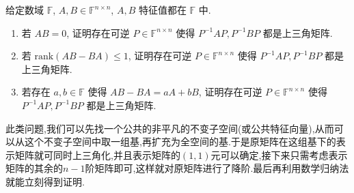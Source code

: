\documentclass[../../main.tex]{subfiles}%
\begin{document}
\begin{proposition}\label{proposition:两个矩阵可同时上三角化的条件}
给定数域 \( \mathbb{F} \), \( A, B \in \mathbb{F}^{n \times n} \), \( A, B \) 特征值都在 \( \mathbb{F} \) 中.
\begin{enumerate}
\item 若 \( AB = 0 \), 证明存在可逆 \( P \in \mathbb{F}^{n \times n} \) 使得 \( P^{-1}AP, P^{-1}BP \) 都是上三角矩阵.

\item 若 \( \mathrm{rank}(AB - BA) \leqslant 1 \), 证明存在可逆 \( P \in \mathbb{F}^{n \times n} \) 使得 \( P^{-1}AP, P^{-1}BP \) 都是上三角矩阵.

\item 若存在 \( a, b \in \mathbb{F} \) 使得 \( AB - BA = aA + bB \), 证明存在可逆 \( P \in \mathbb{F}^{n \times n} \) 使得 \( P^{-1}AP, P^{-1}BP \) 都是上三角矩阵.
\end{enumerate}
\end{proposition}
\begin{note}
此类问题,我们可以先找一个公共的非平凡的不变子空间(或公共特征向量),从而可以从这个不变子空间中取一组基,再扩充为全空间的基.于是原矩阵在这组基下的表示矩阵就可同时上三角化,并且表示矩阵的$(1,1)$元可以确定,接下来只需考虑表示矩阵的其余的$n-1$阶矩阵即可,这样就对原矩阵进行了降阶.最后再利用数学归纳法就能立刻得到证明.
\end{note}
\end{document}
